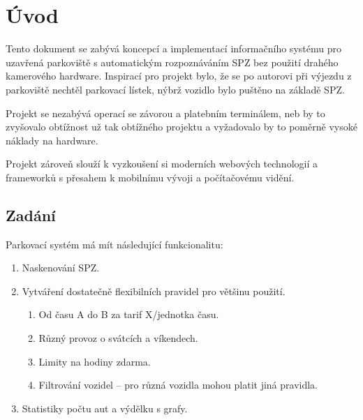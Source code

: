 \chapter{Úvod} \label{uvod}

\noindent
Tento dokument se zabývá koncepcí a implementací informačního systému pro uzavřená
parkoviště s automatickým rozpoznáváním SPZ bez použití drahého kamerového hardware.
Inspirací pro projekt bylo, že se po autorovi při výjezdu z parkoviště nechtěl
parkovací lístek, nýbrž vozidlo bylo puštěno na základě SPZ.

Projekt se nezabývá operací se závorou a platebním terminálem, neb by to zvyšovalo
obtížnost už tak obtížného projektu a vyžadovalo by to poměrně vysoké
náklady na hardware.

Projekt zároveň slouží k vyzkoušení si moderních webových technologií
a frameworků s přesahem k mobilnímu vývoji a počítačovému vidění.

\section*{Zadání} \label{zadani}

\noindent
Parkovací systém má mít následující funkcionalitu:

\begin{enumerate}
  \setlength\itemsep{0.05em}
  \item Naskenování SPZ.
  \item Vytváření dostatečně flexibilních pravidel pro většinu použití.
  \begin{enumerate}
    \setlength\itemsep{0.05em}
      \item Od času A do B za tarif X/jednotka času.
      \item Různý provoz o svátcích a víkendech.
      \item Limity na hodiny zdarma.
      \item Filtrování vozidel -- pro různá vozidla mohou platit jiná pravidla.
    \end{enumerate}
  \item Statistiky počtu aut a výdělku s grafy.
\end{enumerate}
